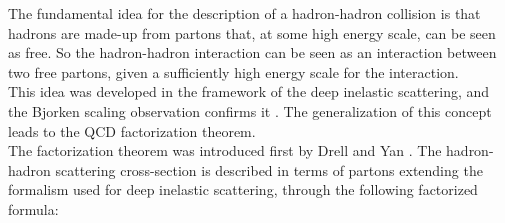 The fundamental idea for the description of a hadron-hadron collision is that hadrons are made-up from partons that, at some high energy scale, can be seen as free. So the hadron-hadron interaction can be seen as an interaction between two free partons, given a sufficiently high energy scale for the interaction.
\\
This idea was developed in the framework of the deep inelastic scattering, and the Bjorken scaling observation confirms it \cite{Bjorken:1968dy}. The generalization of this concept leads to the QCD factorization theorem. 
\\   
The factorization theorem was introduced first by Drell and Yan \cite{DRELL1971578}. 
The hadron-hadron scattering cross-section is described in terms of partons extending the formalism used for deep inelastic scattering, through the following factorized formula:
